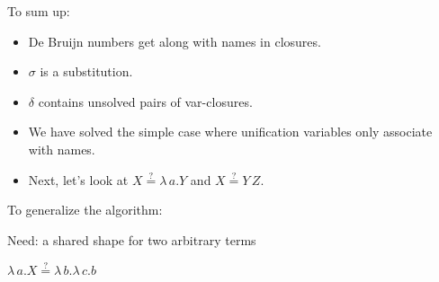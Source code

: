 \documentclass[pdf]{beamer}
\newcommand{\app}[2] {
#1\, #2
}
\newcommand{\eqha}[2] {
  #1\stackrel{?}{=}#2
}
\begin{document}
\begin{frame}{To sum up:}
  
  \begin{itemize}
  \item De Bruijn numbers get along with names in closures.
    
  \item $\sigma$ is a substitution.
    
  \item $\delta$ contains unsolved pairs of var-closures.
    
  \item We have solved the simple case where unification variables only associate
    with names.

  \item Next, let's look at $\eqha{X}{\lambda\,a.Y}$ and $\eqha{X}{\app{Y}{Z}}$.
  \end{itemize}
\end{frame}

\begin{frame}{To generalize the algorithm:}

  {\centering
    Need: a shared shape for two arbitrary terms
  \par}
  
  \vspace{1cm}
  {\centering
    $\lambda\,a.X \stackrel{?}{=} \lambda\,b.\lambda\,c.b$
  \par}
\begin{figure}[H]
  \centering
  \begin{minipage}{0.45\textwidth}
    \centering
{}
  \end{minipage}\hfill
    \begin{minipage}{0.45\textwidth}
    \centering
    \end{minipage}
  \end{figure}
\end{frame}
\end{document}
